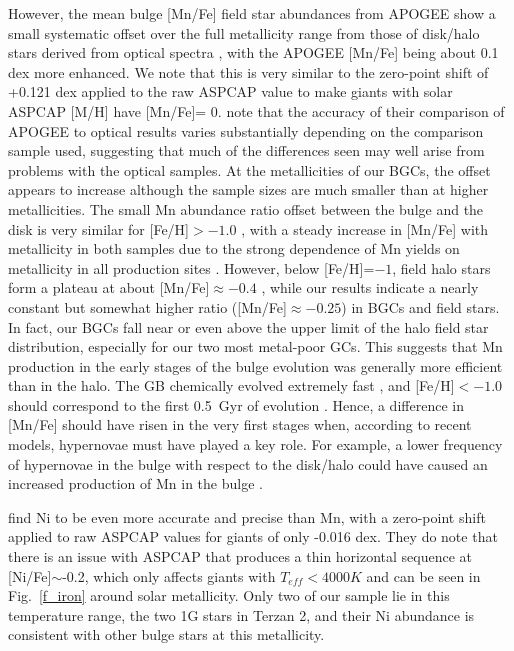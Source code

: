 \documentclass[onecolumn]{aa}
\begin{document}
However, the mean bulge [Mn/Fe] field star abundances from APOGEE show a small systematic offset over the full metallicity range from  those of disk/halo stars derived from optical spectra , with the APOGEE [Mn/Fe] being about 0.1 dex more enhanced. We note that this is very similar to the zero-point shift of +0.121 dex applied to the raw ASPCAP value to make giants with solar ASPCAP [M/H] have [Mn/Fe]= 0. \citet{Henrik2020} note that the accuracy of their comparison of APOGEE to optical results varies substantially depending on the comparison sample used, suggesting that much of the differences seen may well arise from problems with the optical samples. At the metallicities of our BGCs, the offset appears to increase although the sample sizes are much smaller than at higher metallicities. The small Mn abundance ratio offset between the bulge and the disk is very similar for [Fe/H]$>-1.0$ \citep{Lomaeva2019}, with a steady increase in [Mn/Fe] with metallicity in both samples due to the strong dependence of Mn yields on metallicity in all production sites \citep{Woosley1995, Woosley2011}. However, below [Fe/H]=$-1$, field halo stars form a plateau at about [Mn/Fe]$\approx -0.4$ \citep{Nissen2000, Adibekyan12, Reggiani2017}, while our results indicate a nearly constant but somewhat higher ratio ([Mn/Fe]$\approx -0.25$) in BGCs and field stars. In fact, our BGCs fall near or even above the upper limit of the halo field star distribution, especially for our two most metal-poor GCs. This suggests that Mn production in the early stages of the bulge evolution was generally more efficient than in the halo.
The GB chemically evolved extremely fast \citep[e.g.,][]{Bidin2021}, and [Fe/H]$<-1.0$ should correspond to the first 0.5~Gyr of evolution \citep{Lian2020}. Hence, a difference in [Mn/Fe] should have risen in the very first stages when, according to recent models, hypernovae must have played a key role. For example, a lower frequency of hypernovae in the bulge with respect to the disk/halo could have caused an increased production of Mn in the bulge \citep[][see their Fig.5]{Grimmett2020}.

\citet{Henrik2020} find Ni to be even more accurate and precise than Mn, with a zero-point shift applied to raw ASPCAP values for giants of only -0.016 dex. They do note that there is an issue with ASPCAP that produces a thin horizontal sequence at [Ni/Fe]$\sim$-0.2, which only affects giants with $T_{eff}<4000K$ and can be seen in Fig.~\ref{f_iron} around solar metallicity. Only two of our sample lie in this temperature range, the two 1G stars in Terzan 2, and their Ni abundance is consistent with other bulge stars at this metallicity. 
\end{document}
